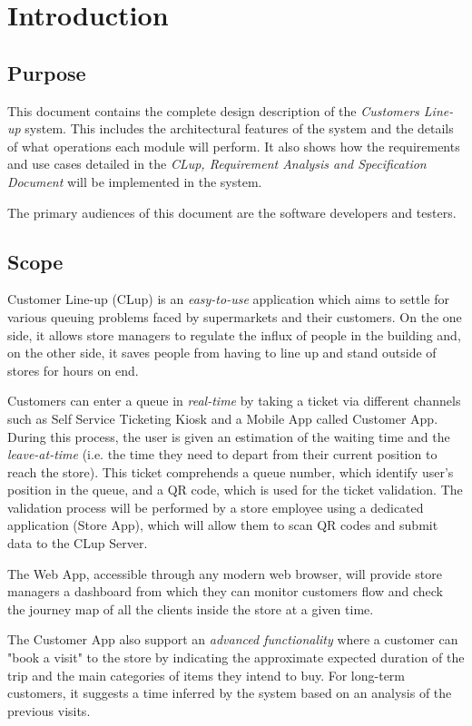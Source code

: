 \chapter{Introduction}

\section{Purpose}
This document contains the complete design description of the \textit{Customers Line-up} system. This includes the architectural features of the system and the details of what operations each module will perform. It also shows how the requirements and use cases detailed in the \textit{CLup, Requirement Analysis and Specification Document} will be implemented in the system.

The primary audiences of this document are the software developers and testers.

\section{Scope}
Customer Line-up (CLup) is an \textit{easy-to-use} application which aims to settle for various queuing problems faced by supermarkets and their customers.\newline
On the one side, it allows store managers to regulate the influx of people in the building and, on the other side, it saves people from having to line up and stand outside of stores for hours on end.

Customers can enter a queue in \textit{real-time} by taking a ticket via different channels such as Self Service Ticketing Kiosk and a Mobile App called Customer App. During this process, the user is given an estimation of the waiting time and the \textit{leave-at-time} (i.e. the time they need to depart from their current position to reach the store). This ticket comprehends a queue number, which identify user's position in the queue, and a QR code, which is used for the ticket validation.\newline
The validation process will be performed by a store employee using a dedicated application (Store App), which will allow them to scan QR codes and submit data to the CLup Server.

The Web App, accessible through any modern web browser, will provide store managers a dashboard from which they can monitor customers flow and check the journey map of all the clients inside the store at a given time.

The Customer App also support an \textit{advanced functionality} where a customer can "book a visit" to the store by indicating the approximate expected duration of the trip and the main categories of items they intend to buy. For long-term customers, it suggests a time inferred by the system based on an analysis of the previous visits.

